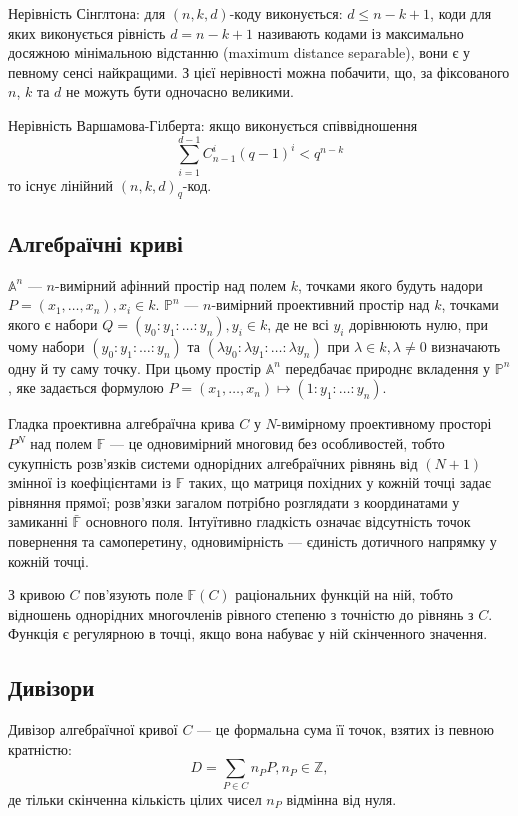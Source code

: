 \documentclass[a4paper,14pt,oneside]{extarticle}
\begin{document}
Нерівність Сінглтона: для $(n, k, d)$-коду виконується: $d \le n-k+1$, 
коди для яких виконується рівність $d = n-k+1$ називають кодами із максимально досяжною мінімальною відстанню (maximum distance separable), вони є у певному сенсі найкращими. 
З цієї нерівності можна побачити, що, за фіксованого $n$, $k$ та $d$ не можуть бути одночасно великими.

Нерівність Варшамова-Гілберта: якщо виконується співвідношення 
$$\sum_{i=1}^{d-1} C_{n-1}^i (q-1)^i < q^{n-k}$$
то існує лінійний $(n, k ,d)_q$-код.


\subsection{Алгебраїчні криві}
$\mathbb{A}^n$ --- $n$-вимірний афінний простір над полем $k$, точками якого будуть надори $P = (x_1, \dots, x_n), x_i \in k$. 
$\mathbb{P}^n$ --- $n$-вимірний проективний простір над $k$, точками якого є набори $Q=(y_0 : y_1 : \ldots : y_n), y_i \in k$, де не всі $y_i$ дорівнюють нулю,
при чому набори $(y_0 : y_1 : \ldots : y_n)$ та $(\lambda y_0 : \lambda y_1 : \ldots : \lambda y_n)$ при $\lambda \in k, \lambda \neq 0$ визначають одну й ту саму точку. 
При цьому простір $\mathbb{A}^n$ передбачає природнє вкладення у $\mathbb{P}^n$, яке задається формулою $P = (x_1, \dots, x_n) \mapsto (1: y_1 : \ldots : y_n)$.

Гладка проективна алгебраїчна крива $C$ у $N$-вимірному проективному просторі $P^N$ над полем $\mathbb{F}$ --- 
це одновимірний многовид без особливостей, тобто сукупність розв'язків системи однорідних алгебраїчних рівнянь від
$(N+1)$ змінної із коефіцієнтами із $\mathbb{F}$ таких, що матриця похідних у кожній точці задає рівняння прямої; 
розв'язки загалом потрібно розглядати з координатами у замиканні $\bar{\mathbb{F}}$ основного поля.
Інтуїтивно гладкість означає відсутність точок повернення та самоперетину, одновимірність --- єдиність 
дотичного напрямку у кожній точці.

З кривою $C$ пов'язують поле $\mathbb{F}(C)$ раціональних функцій на ній, тобто відношень однорідних многочленів 
рівного степеню з точністю до рівнянь з $C$. Функція є регулярною в точці, якщо вона набуває у ній скінченного значення.



\subsection{Дивізори}
Дивізор алгебраїчної кривої $C$ --- це формальна сума її точок, взятих із певною кратністю:
$$D = \sum_{P \in C} n_P P, n_P \in \mathbb{Z},$$
де тільки скінченна кількість цілих чисел $n_P$ відмінна від нуля.
\end{document}
